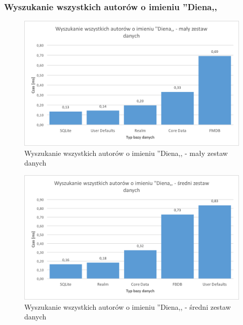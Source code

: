 \subsubsection{Wyszukanie wszystkich autorów o imieniu ''Diena,,}

\begin{figure}[H]
\centering
	\includegraphics[width=15cm]{img/read_data/read_by_authors/read_by_author_small_test.png}
	\caption{Wyszukanie wszystkich autorów o imieniu ''Diena,, - mały zestaw danych}
	\label{fig: read-by-author-small}
\end{figure}

\begin{figure}[H]
\centering
	\includegraphics[width=15cm]{img/read_data/read_by_authors/read_by_author_medium_test.png}
	\caption{Wyszukanie wszystkich autorów o imieniu ''Diena,, - średni zestaw danych}
	\label{fig: read-by-author-medium}
\end{figure}

